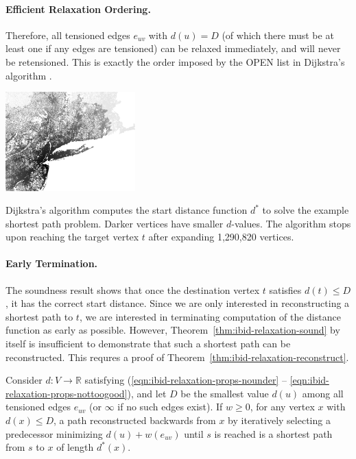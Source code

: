 \paragraph{Efficient Relaxation Ordering.}
Therefore,
all tensioned edges $e_{uv}$ with $d(u) = D$
(of which there must be at least one if any edges are tensioned)
can be relaxed immediately,
and will never be retensioned.
This is exactly the order imposed by the OPEN list in Dijkstra's
algorithm \citep{dijkstra1959anote}.

\begin{marginfigure}%
   \centering%
   \includegraphics[width=5cm]{figs/incbi-road-ne/singleshot/example-dijkstra.png}%
   \caption{Dijkstra's algorithm computes the start distance function
      $d^*$ to solve the example shortest path problem.
      Darker vertices have smaller $d$-values.
      The algorithm stops upon reaching the target vertex $t$
      after expanding 1,290,820 vertices.}%
   \label{fig:ibid:example-distance}%
\end{marginfigure}

\paragraph{Early Termination.}
The soundness result shows that once the destination
vertex $t$ satisfies $d(t) \leq D$,
it has the correct start distance.
Since we are only interested in reconstructing a shortest path to $t$,
we are interested in terminating computation of the distance
function as early as possible.
However,
Theorem~\ref{thm:ibid-relaxation-sound} by itself is insufficient
to demonstrate that such a shortest path can be reconstructed.
This requres a proof of Theorem~\ref{thm:ibid-relaxation-reconstruct}.

\begin{theorem}
Consider $d: V \rightarrow \mathbb{R}$
satisfying (\ref{eqn:ibid-relaxation-props-nounder} --
\ref{eqn:ibid-relaxation-props-nottoogood}),
and let $D$ be the smallest value $d(u)$
among all tensioned edges $e_{uv}$
(or $\infty$ if no such edges exist).
If $w \geq 0$,
for any vertex $x$ with $d(x) \leq D$,
a path reconstructed backwards from $x$ by iteratively selecting a
predecessor minimizing $d(u) + w(e_{uv})$ until $s$ is reached
is a shortest path from $s$ to $x$ of length $d^*(x)$.
\label{thm:ibid-relaxation-reconstruct}
\end{theorem}

